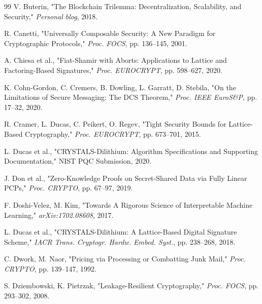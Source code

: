 \documentclass[preprint,12pt]{elsarticle}
\begin{document}
\begin{thebibliography}{99}
                V. Buterin, 
                "The Blockchain Trilemma: Decentralization, Scalability, and Security," 
                \textit{Personal blog}, 2018.


                R. Canetti, 
                "Universally Composable Security: A New Paradigm for Cryptographic Protocols," 
                \textit{Proc. FOCS}, pp. 136–145, 2001.

                A. Chiesa et al., 
                "Fiat-Shamir with Aborts: Applications to Lattice and Factoring-Based Signatures," 
                \textit{Proc. EUROCRYPT}, pp. 598–627, 2020.

                K. Cohn-Gordon, C. Cremers, B. Dowling, L. Garratt, D. Stebila, 
                "On the Limitations of Secure Messaging: The DCS Theorem," 
                \textit{Proc. IEEE EuroS\&P}, pp. 17–32, 2020.

                R. Cramer, L. Ducas, C. Peikert, O. Regev, 
                "Tight Security Bounds for Lattice-Based Cryptography," 
                \textit{Proc. EUROCRYPT}, pp. 673–701, 2015.

                L. Ducas et al., 
                "CRYSTALS-Dilithium: Algorithm Specifications and Supporting Documentation," 
                NIST PQC Submission, 2020.

                J. Don et al., 
                "Zero-Knowledge Proofs on Secret-Shared Data via Fully Linear PCPs," 
                \textit{Proc. CRYPTO}, pp. 67–97, 2019.

                F. Doshi-Velez, M. Kim, 
                "Towards A Rigorous Science of Interpretable Machine Learning," 
                \textit{arXiv:1702.08608}, 2017.

                L. Ducas et al., 
                "CRYSTALS-Dilithium: A Lattice-Based Digital Signature Scheme," 
                \textit{IACR Trans. Cryptogr. Hardw. Embed. Syst.}, pp. 238–268, 2018.

                C. Dwork, M. Naor, 
                "Pricing via Processing or Combatting Junk Mail," 
                \textit{Proc. CRYPTO}, pp. 139–147, 1992.

                S. Dziembowski, K. Pietrzak, 
                "Leakage-Resilient Cryptography," 
                \textit{Proc. FOCS}, pp. 293–302, 2008.


\end{thebibliography}
\end{document}
